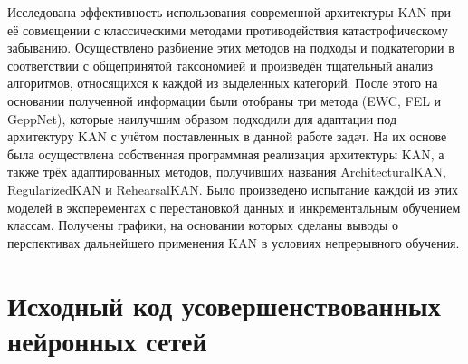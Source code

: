 \documentclass[a4paper,14pt]{extarticle}
\begin{document}
Исследована эффективность использования современной архитектуры KAN при её
совмещении с классическими методами противодействия катастрофическому
забыванию. Осуществлено разбиение этих методов на подходы и подкатегории в
соответствии с общепринятой таксономией и произведён тщательный анализ
алгоритмов, относящихся к каждой из выделенных категорий. После этого на
основании полученной информации были отобраны три метода (EWC, FEL и GeppNet),
которые наилучшим образом подходили для адаптации под архитектуру KAN с учётом
поставленных в данной работе задач. На их основе была осуществлена собственная
программная реализация архитектуры KAN, а также трёх адаптированных методов,
получивших названия ArchitecturalKAN, RegularizedKAN и RehearsalKAN. Было
произведено испытание каждой из этих моделей в эксперементах с перестановкой
данных и инкрементальным обучением классам. Получены графики, на основании
которых сделаны выводы о перспективах дальнейшего применения KAN в условиях
непрерывного обучения. 
\pagebreak


\printbibliography[heading=bibintoc]
\pagebreak


\appendix
{}
\captionsetup[listing]{name=Приложение}
\section{Исходный код усовершенствованных нейронных сетей}
\begin{center}
    \label{apdx:kan}
    \inputminted{python}{../../spbu_bachelor_thesis/nn/kan.py}

    \label{apdx:architectural_kan}
    \inputminted{python}{../../spbu_bachelor_thesis/nn/architectural_kan.py}

    \label{apdx:regularized_kan}
    \inputminted{python}{../../spbu_bachelor_thesis/nn/regularized_kan.py}

    \label{apdx:rehearsal_kan}
    \inputminted{python}{../../spbu_bachelor_thesis/nn/rehearsal_kan.py}
\end{center}
\end{document}
